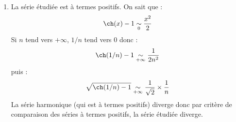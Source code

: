 \documentclass[a4paper,twoside,french,10pt]{VcCours}
\begin{document}
\begin{enumerate}
    \item La série étudiée est à termes positifs. On sait que :
    $$ \ch(x) -1 \underset{0}{\sim} \dfrac{x^2}{2}$$
    Si $n$ tend vers $+ \infty$, $1/n$ tend vers $0$ donc :
    $$ \ch(1/n)-1 \underset{+ \infty}{\sim} \dfrac{1}{2n^2}$$
    puis :
    $$ \sqrt{\ch(1/n)-1} \underset{+ \infty}{\sim} \dfrac{1}{\sqrt{2}} \times \dfrac{1}{n}$$
    La série harmonique (qui est à termes positifs) diverge donc par critère de comparaison des séries à termes positifs, la série étudiée diverge.

\end{enumerate}
\end{document}
